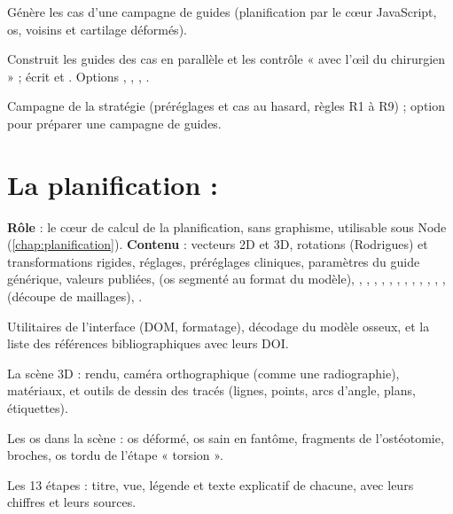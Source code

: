  Génère les cas d'une campagne de guides (planification par le cœur
JavaScript, os, voisins et cartilage déformés).

 Construit les guides des cas en parallèle et les contrôle « avec l'œil du
chirurgien » ; écrit  et . Options ,
, , .

 Campagne de la stratégie (préréglages et cas au hasard, règles R1 à R9) ;
option  pour préparer une campagne de guides.

\section{La planification : \texorpdfstring{}{code\_source/cora/}}

\textbf{Rôle} : le cœur de calcul de la planification, sans graphisme, utilisable sous Node (\cref{chap:planification}).
\textbf{Contenu} : vecteurs 2D et 3D, rotations (Rodrigues) et transformations rigides, réglages, préréglages
cliniques, paramètres du guide générique, valeurs publiées,  (os segmenté au format du modèle),
, , , , ,
, , , ,
, , ,  (découpe de maillages),
.

 Utilitaires de l'interface (DOM, formatage), décodage du modèle osseux, et
la liste des références bibliographiques avec leurs DOI.

 La scène 3D : rendu, caméra orthographique (comme une radiographie),
matériaux, et outils de dessin des tracés (lignes, points, arcs d'angle, plans, étiquettes).

 Les os dans la scène : os déformé, os sain en fantôme, fragments de
l'ostéotomie, broches, os tordu de l'étape « torsion ».

 Les 13 étapes : titre, vue, légende et texte explicatif de chacune, avec
leurs chiffres et leurs sources.

